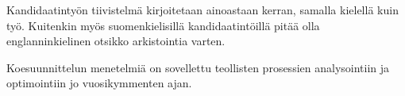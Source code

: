 \documentclass[12pt,a4paper,finnish]{tutthesis}
\begin{document}
Kandidaatintyön tiivistelmä kirjoitetaan ainoastaan kerran, samalla
kielellä kuin työ. Kuitenkin myös suomenkielisillä kandidaatintöillä
pitää olla englanninkielinen otsikko arkistointia varten.

Koesuunnittelun menetelmiä on sovellettu teollisten prosessien analysointiin ja
optimointiin jo vuosikymmenten ajan.



%
%
%
%




\makeatother %
\end{document}
